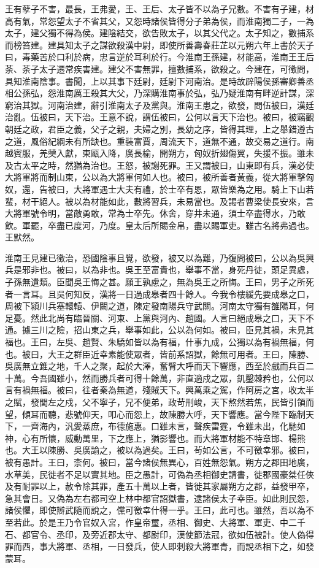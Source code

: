王有孽子不害，最長，王弗愛，王、王后、太子皆不以為子兄數。不害有子建，材高有氣，常怨望太子不省其父，又怨時諸侯皆得分子弟為侯，而淮南獨二子，一為太子，建父獨不得為侯。建陰結交，欲告敗太子，以其父代之。太子知之，數捕系而榜笞建。建具知太子之謀欲殺漢中尉，即使所善壽春莊芷以元朔六年上書於天子曰，毒藥苦於口利於病，忠言逆於耳利於行。今淮南王孫建，材能高，淮南王王后荼、荼子太子遷常疾害建。建父不害無罪，擅數捕系，欲殺之。今建在，可徵問，具知淮南陰事。書聞，上以其事下廷尉，廷尉下河南治。是時故辟陽侯孫審卿善丞相公孫弘，怨淮南厲王殺其大父，乃深購淮南事於弘，弘乃疑淮南有畔逆計謀，深窮治其獄。河南治建，辭引淮南太子及黨與。淮南王患之，欲發，問伍被曰，漢廷治亂。伍被曰，天下治。王意不說，謂伍被曰，公何以言天下治也。被曰，被竊觀朝廷之政，君臣之義，父子之親，夫婦之別，長幼之序，皆得其理，上之舉錯遵古之道，風俗紀綱未有所缺也。重裝富賈，周流天下，道無不通，故交易之道行。南越賓服，羌僰入獻，東甌入降，廣長榆，開朔方，匈奴折翅傷翼，失援不振。雖未及古太平之時，然猶為治也。王怒，被謝死罪。王又謂被曰，山東即有兵，漢必使大將軍將而制山東，公以為大將軍何如人也。被曰，被所善者黃義，從大將軍擊匈奴，還，告被曰，大將軍遇士大夫有禮，於士卒有恩，眾皆樂為之用。騎上下山若蜚，材干絕人。被以為材能如此，數將習兵，未易當也。及謁者曹梁使長安來，言大將軍號令明，當敵勇敢，常為士卒先。休舍，穿井未通，須士卒盡得水，乃敢飲。軍罷，卒盡已度河，乃度。皇太后所賜金帛，盡以賜軍吏。雖古名將弗過也。王默然。

淮南王見建已徵治，恐國陰事且覺，欲發，被又以為難，乃復問被曰，公以為吳興兵是邪非也。被曰，以為非也。吳王至富貴也，舉事不當，身死丹徒，頭足異處，子孫無遺類。臣聞吳王悔之甚。願王孰慮之，無為吳王之所悔。王曰，男子之所死者一言耳。且吳何知反，漢將一日過成皋者四十餘人。今我令樓緩先要成皋之口，周被下潁川兵塞轘轅、伊闕之道，陳定發南陽兵守武關。河南太守獨有雒陽耳，何足憂。然此北尚有臨晉關、河東、上黨與河內、趙國。人言曰絕成皋之口，天下不通。據三川之險，招山東之兵，舉事如此，公以為何如。被曰，臣見其禍，未見其福也。王曰，左吳、趙賢、朱驕如皆以為有福，什事九成，公獨以為有禍無福，何也。被曰，大王之群臣近幸素能使眾者，皆前系詔獄，餘無可用者。王曰，陳勝、吳廣無立錐之地，千人之聚，起於大澤，奮臂大呼而天下響應，西至於戲而兵百二十萬。今吾國雖小，然而勝兵者可得十餘萬，非直適戍之眾，釠鑿棘矜也，公何以言有禍無福。被曰，往者秦為無道，殘賊天下。興萬乘之駕，作阿房之宮，收太半之賦，發閭左之戍，父不寧子，兄不便弟，政苛刑峻，天下熬然若焦，民皆引領而望，傾耳而聽，悲號仰天，叩心而怨上，故陳勝大呼，天下響應。當今陛下臨制天下，一齊海內，汎愛蒸庶，布德施惠。口雖未言，聲疾雷霆，令雖未出，化馳如神，心有所懷，威動萬里，下之應上，猶影響也。而大將軍材能不特章邯、楊熊也。大王以陳勝、吳廣諭之，被以為過矣。王曰，茍如公言，不可徼幸邪。被曰，被有愚計。王曰，柰何。被曰，當今諸侯無異心，百姓無怨氣。朔方之郡田地廣，水草美，民徙者不足以實其地。臣之愚計，可偽為丞相御史請書，徙郡國豪桀任俠及有耐罪以上，赦令除其罪，產五十萬以上者，皆徙其家屬朔方之郡，益發甲卒，急其會日。又偽為左右都司空上林中都官詔獄書，逮諸侯太子幸臣。如此則民怨，諸侯懼，即使辯武隨而說之，儻可徼幸什得一乎。王曰，此可也。雖然，吾以為不至若此。於是王乃令官奴入宮，作皇帝璽，丞相、御史、大將軍、軍吏、中二千石、都官令、丞印，及旁近郡太守、都尉印，漢使節法冠，欲如伍被計。使人偽得罪而西，事大將軍、丞相，一日發兵，使人即刺殺大將軍青，而說丞相下之，如發蒙耳。

